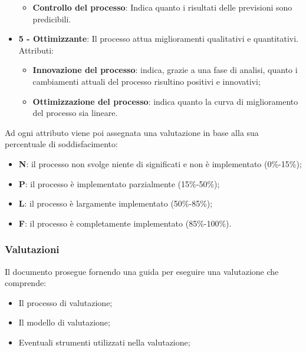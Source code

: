 \documentclass[../piano-di-qualifica.tex]{subfiles}
\begin{document}
\begin{itemize}
\begin{itemize}
            \item \textbf{Controllo del processo}: Indica quanto i risultati delle previsioni sono predicibili.
        \end{itemize}
    \item \textbf{5 - Ottimizzante}: Il processo attua miglioramenti qualitativi e quantitativi.
        \\ Attributi:
        \begin{itemize}
            \item \textbf{Innovazione del processo}: indica, grazie a una fase di analisi, quanto i cambiamenti attuali del processo risultino positivi e innovativi;
            \item \textbf{Ottimizzazione del processo}: indica quanto la curva di miglioramento del processo sia lineare.
        \end{itemize}
\end{itemize}

Ad ogni attributo viene poi assegnata una valutazione in base alla sua percentuale di soddisfacimento:

\begin{itemize}
    \item \textbf{N}: il processo non svolge niente di significati e non è implementato (0\%-15\%);
    \item \textbf{P}: il processo è implementato parzialmente (15\%-50\%);
    \item \textbf{L}: il processo è largamente implementato (50\%-85\%);
    \item \textbf{F}: il processo è completamente implementato (85\%-100\%).
\end{itemize}


\subsubsection{Valutazioni}
\label{sub:valutazioni}
Il documento prosegue fornendo una guida per eseguire una valutazione che comprende:
\begin{itemize}
    \item Il processo di valutazione;
    \item Il modello di valutazione;
    \item Eventuali strumenti utilizzati nella valutazione;
\end{itemize}
\end{document}
